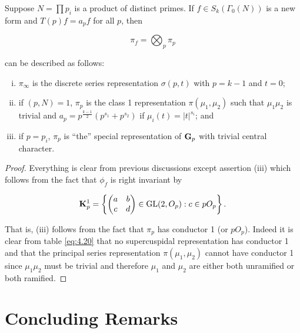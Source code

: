 \begin{proposition}\label{prop:5.21}

Suppose $N = \prod p_i$ is a product of distinct primes. If $f \in S_k(\Gamma_0(N))$ is a new form and $T(p)f = a_p f$ for all $p$, then

\[
\pi_f = \bigotimes_p \pi_p
\]

can be described as follows:

\begin{enumerate}[(i)]

\item $\pi_{\infty}$ is the discrete series representation $\sigma(p, t)$ with $p = k-1$ and $t = 0$;

\item if $(p, N) = 1$, $\pi_p$ is the class 1 representation $\pi(\mu_1, \mu_2)$ such that $\mu_1\mu_2$ is trivial and $a_p = p^{\frac{k-1}{2}}(p^{s_1} + p^{s_2})$ if $\mu_i(t) = |t|^{s_i}$; and

\item if $p = p_i$, $\pi_p$ is ``the'' special representation of $\mathbf{G}_p$ with trivial central character.

\end{enumerate}

\end{proposition}

\begin{proof}

Everything is clear from previous discussions except assertion (iii) which follows from the fact that $\phi_f$ is right invariant by

\[
\mathbf{K}_p^1 = \left\{\begin{pmatrix} a & b \\ c & d \end{pmatrix} \in \operatorname{GL}(2, O_p) : c \in pO_p \right\}.
\]

That is, (iii) follows from the fact that $\pi_p$ has conductor 1 (or $pO_p$). Indeed it is clear from table \eqref{eq:4.20} that no supercuspidal representation has conductor 1 and that the principal series representation $\pi(\mu_1, \mu_2)$ cannot have conductor 1 since $\mu_1\mu_2$ must be trivial and therefore $\mu_1$ and $\mu_2$ are either both unramified or both ramified.

\end{proof}

\section*{Concluding Remarks}

